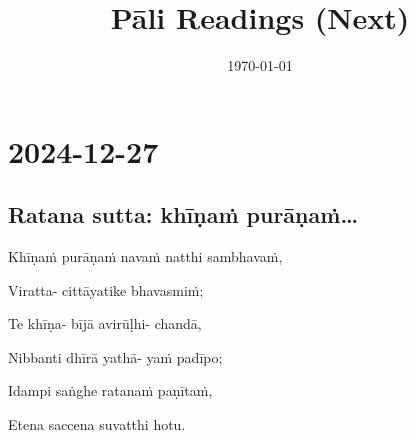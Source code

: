 \documentclass[11pt,oneside]{memoir}
\date{\today}
\title{Pāli Readings (Next)}
\begin{document}
\maketitle
\makeatletter

\newlength{\colOne}\setlength{\colOne}{0.35\linewidth}
\newlength{\colTwo}\setlength{\colTwo}{0.6\linewidth}

\renewenvironment{quote}%
{\list{}{%
    \doubleLineSize
    \listparindent 0pt
    \itemindent    0pt
    \leftmargin    3em
    \rightmargin   3em
    \parsep        0pt
    \topsep        8pt
    \partopsep     0pt}%
\item[] \raggedright}%
{\endlist}

\renewcommand*\sentenceDiaSolution[2][0.4]{%
  \ifanswerkey%
    \hspace*{-\spinemargin}%
    \begin{minipage}{\paperwidth}%
      \centering%
      \texttt{[image: \#2]}%
    \end{minipage}%
  \fi%
}

\makeatother

\mainmatter

\chapter{2024-12-27}
\label{sec:orgf6b07ff}
\section{Ratana sutta: khīṇaṁ purāṇaṁ\ldots{}}
\label{sec:org0156a39}

\begin{quote}
Khīṇaṁ purāṇaṁ navaṁ natthi sambhavaṁ,

Viratta- cittāyatike bhavasmiṁ;

Te khīṇa- bījā avirūḷhi- chandā,

Nibbanti dhīrā yathā- yaṁ padīpo;

Idampi saṅghe ratanaṁ paṇītaṁ,

Etena saccena suvatthi hotu.
\end{quote}
\end{document}
